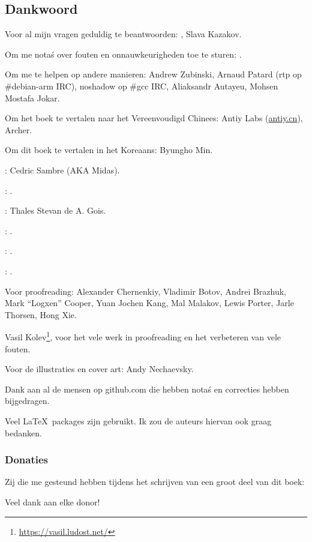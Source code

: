 \subsection*{Dankwoord}

Voor al mijn vragen geduldig te beantwoorden: \HERMIT, Slava  Kazakov.

Om me nota\'s over fouten en onnauwkeurigheden toe te sturen: \PeopleMistakesInaccuracies{}.

Om me te helpen op andere manieren:
Andrew Zubinski,
Arnaud Patard (rtp op \#debian-arm IRC),
noshadow op \#gcc IRC,
Aliaksandr Autayeu, Mohsen Mostafa Jokar.

Om het boek te vertalen naar het Vereenvoudigd Chinees:
Antiy Labs (\href{http://antiy.cn}{antiy.cn}), Archer.

Om dit boek te vertalen in het Koreaans: Byungho Min.

\NLph{}: Cedric Sambre (AKA Midas).

\NLph{}: \PeopleSpanishTranslators{}.

\NLph{}: Thales Stevan de A. Gois.

\NLph{}: \PeopleItalianTranslators{}.

\NLph{}: \PeopleFrenchTranslators{}.

\NLph{}: \PeopleGermanTranslators{}.

Voor proofreading:
Alexander  Chernenkiy,
Vladimir Botov,
Andrei Brazhuk,
Mark ``Logxen'' Cooper, Yuan Jochen Kang, Mal Malakov, Lewis Porter, Jarle Thorsen, Hong Xie.

Vasil Kolev\footnote{\url{https://vasil.ludost.net/}}, voor het vele werk in proofreading en het verbeteren van vele fouten.

Voor de illustraties en cover art: Andy Nechaevsky.

Dank aan al de mensen op github.com die hebben nota\'s en correcties hebben bijgedragen\FNGithubContributors{}.

Veel \LaTeX\ packages zijn gebruikt. Ik zou de auteurs hiervan ook graag bedanken.

\subsubsection*{Donaties}

Zij die me gesteund hebben tijdens het schrijven van een groot deel van dit boek:



Veel dank aan elke donor!
